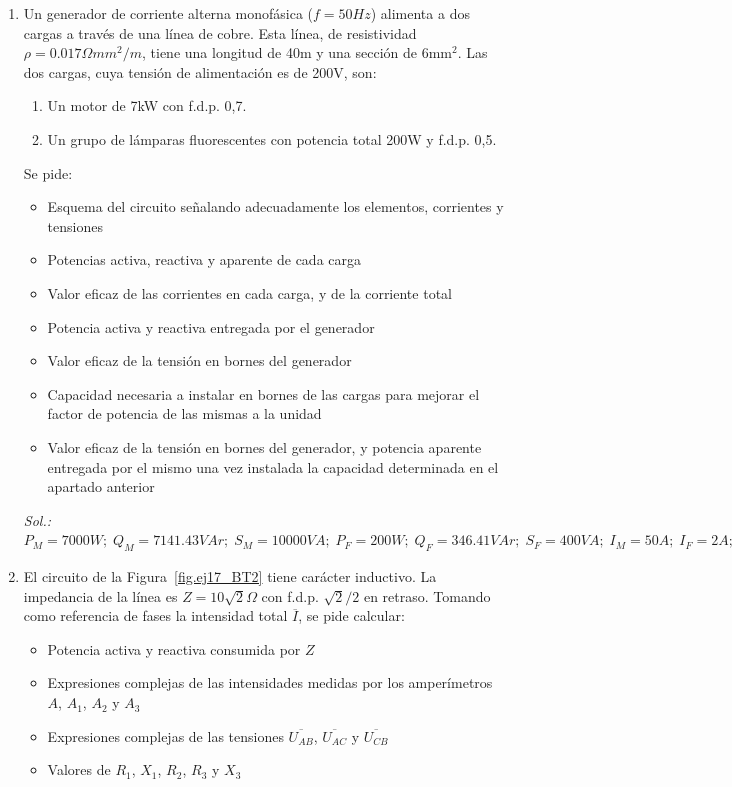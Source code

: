 \documentclass[11pt]{book} %
\begin{document}
\begin{enumerate}
\item Un generador de corriente alterna monofásica ($f = {50}{Hz}$) alimenta a dos cargas a través de una línea de cobre. Esta línea, de resistividad $\rho = {0.017}{\Omega mm^2/m}$, tiene una longitud de {40}{m} y una sección de {6}{mm$^2$}. Las dos cargas, cuya tensión de alimentación es de {200}{V}, son:
\begin{enumerate}
\item Un motor de {7}{kW} con f.d.p. {0,7}.
\item Un grupo de lámparas fluorescentes con potencia total {200}{W} y f.d.p. {0,5}.
\end{enumerate}
Se pide: 
\begin{itemize}
    \item Esquema del circuito señalando adecuadamente los elementos, corrientes y tensiones
    \item Potencias activa, reactiva y aparente de cada carga
    \item Valor eficaz de las corrientes en cada carga, y de la corriente total
    \item Potencia activa y reactiva entregada por el generador
    \item Valor eficaz de la tensión en bornes del generador
    \item Capacidad necesaria a instalar en bornes de las cargas para mejorar el factor de potencia de las mismas a la unidad
    \item Valor eficaz de la tensión en bornes del generador, y potencia aparente entregada por el mismo una vez instalada la capacidad determinada en el apartado anterior
\end{itemize}
\emph{Sol.: $P_M = {7000}{W};\; Q_M = {7141.43}{VAr};\; S_M ={10000}{VA};\; P_F = {200}{W};\;  Q_F = {346.41}{VAr};\; S_F ={400}{VA};\;I_M = {50}{A};\; I_F = {2}{A};\; I_T = {51.94}{A};\;P_g = {7811.50}{W};\; Q_g = {7487.8}{VAr};\; U_g = {208.33}{V}; C={595.86}{\mu F};\; U_g' = {207.92}{V};\; S_g' = {7485.12}{VA}$ }
\item El circuito de la Figura~\ref{fig.ej17_BT2} tiene carácter inductivo.  La impedancia de la línea es $Z={10\sqrt{2}}{\Omega}$ con
f.d.p. $\sqrt{2}/2$ en retraso. Tomando como referencia de fases la intensidad total $\overline{I}$, se pide calcular:
\begin{itemize}
\item Potencia activa y reactiva consumida por $Z$
\item Expresiones complejas de las intensidades medidas por los amperímetros $A$, $A_1$, $A_2$ y $A_3$ 
\item  Expresiones complejas de las tensiones $\overline{U_{AB}}$, $\overline{U_{AC}}$ y $\overline{U_{CB}}$
\item  Valores de $R_1$, $X_1$, $R_2$, $R_3$ y $X_3$
\end{itemize}


\end{enumerate}
\end{document}
